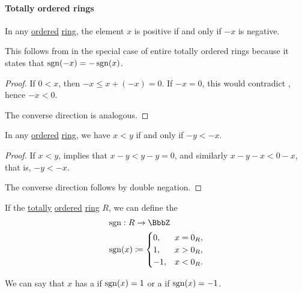 \paragraph{Totally ordered rings}

\begin{proposition}\label{thm:ordered_ring_inversion}
  In any \hyperref[def:ordered_semiring]{ordered} \hyperref[def:ring]{ring}, the element \( x \) is positive if and only if \( -x \) is negative.
\end{proposition}
\begin{comments}
  \item This follows from  in the special case of entire totally ordered rings because it states that \( \operatorname{sgn}(-x) = -\operatorname{sgn}(x) \).
\end{comments}
\begin{proof}
  If \( 0 < x \), then \( -x \leq x + (-x) = 0 \). If \( -x = 0 \), this would contradict , hence \( -x < 0 \).

  The converse direction is analogous.
\end{proof}

\begin{proposition}\label{thm:ordered_ring_order_inversion}
  In any \hyperref[def:ordered_semiring]{ordered} \hyperref[def:ring]{ring}, we have \( x < y \) if and only if \( -y < -x \).
\end{proposition}
\begin{proof}
  If \( x < y \),  implies that \( x - y < y - y = 0 \), and similarly \( x - y - x < 0 - x \), that is, \( -y < -x \).

  The converse direction follows by double negation.
\end{proof}

\begin{definition}\label{def:totally_ordered_ring_signum}\mimprovised
  If the \hyperref[def:totally_ordered_set]{totally} \hyperref[def:ordered_semiring]{ordered} \hyperref[def:ring]{ring} \( R \), we can define the 
  \begin{equation*}
    \begin{aligned}
      &\sgn: R \to \BbbZ \\
      &\sgn(x) \coloneqq \begin{cases}
        0,  &x = 0_R, \\
        1,  &x > 0_R, \\
        -1, &x < 0_R.
      \end{cases}
    \end{aligned}
  \end{equation*}

  We can say that \( x \) has a  if \( \operatorname{sgn}(x) = 1 \) or a  if \( \operatorname{sgn}(x) = -1 \).
\end{definition}


